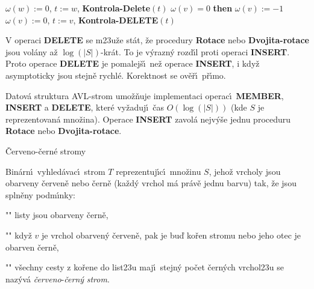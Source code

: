 \phantom{---------}$\omega \left(w\right):=0$, $t:=w$, {\bf Kontrola-Delete}$\left(t\right)$\newline
\phantom{------}{\bf endif}\newline 
\phantom{---}{\bf else}\newline 
\phantom{------}{\bf if} $\omega \left(v\right)=0$ {\bf then}\newline 
\phantom{---------}$\omega \left(v\right):=-1$\newline 
\phantom{------}{\bf else}\newline 
\phantom{---------}$\omega \left(v\right):=0$, $t:=v$, {\bf Kontrola-DELETE}$\left(t\right)$\newline \phantom{------}{\bf endif}\newline 
\phantom{---}{\bf endif\newline 
endif}
\medskip

\flushpar V operaci {\bf DELETE} se m\accent23u\v ze st\'at, \v ze procedury 
{\bf Rotace} nebo {\bf Dvojita-rotace} jsou vol\'any a\v z $\log\left(
|S|\right)$-kr\'at. 
To je v\'yrazn\'y rozd\'\i l proti operaci {\bf INSERT}. Proto operace 
{\bf DELETE} je pomalej\v s\'\i\ ne\v z operace {\bf INSERT}, i kdy\v z 
asymptoticky jsou stejn\v e rychl\'e. Korektnost se 
ov\v e\v r\'\i\ p\v r\'\i mo.

Datov\'a struktura AVL-strom 
umo\v z\v nuje implementaci operac\'\i\ {\bf MEMBER}, {\bf INSERT} a 
{\bf DELETE}, kter\'e vy\v zaduj\'\i\ \v cas $O\left(\log\left(|S|\right)\right)$ (kde $
S$ je 
reprezentovan\'a mno\v zina).  Ope\-race {\bf INSERT} zavol\'a 
nejv\'y\v se jednu proceduru {\bf Rotace} nebo {\bf Dvo\-ji\-ta-rotace}.  
\endproclaim
\medskip

\heading 
\v Cerveno-\v cern\'e stromy
\endheading

\flushpar Bin\'arn\'\i\ vyhled\'avac\'\i\ strom $T$ reprezentuj\'\i c\'\i\ 
mno\v zinu $S$, jeho\v z vrcholy jsou obarveny \v cerven\v e nebo 
\v cern\v e (ka\v zd\'y vrchol m\'a pr\'av\v e jednu barvu) tak, \v ze jsou 
spln\v eny podm\'\i nky:
\roster
\item"{}"
listy jsou obarveny \v cern\v e,
\item"{}"
kdy\v z $v$ je vrchol obarven\'y \v cerven\v e, pak je bu\v d ko\v ren 
stromu nebo jeho otec je obarven \v cern\v e,
\item"{}"
v\v sechny cesty z ko\v rene do list\accent23u maj\'\i\ stejn\'y 
po\v cet \v cer\-n\'ych vrchol\accent23u
\endroster
se naz\'yv\'a \emph{\v cerveno}-\emph{\v cern\'y} \emph{strom}. 
\medskip

